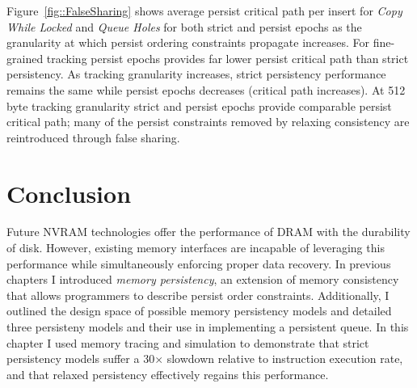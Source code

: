  

Figure~\ref{fig::FalseSharing} shows average persist critical path per insert for \emph{Copy While Locked} and \emph{Queue Holes} for both strict and persist epochs as the granularity at which persist ordering constraints propagate increases.
For fine-grained tracking persist epochs provides far lower persist critical path than strict persistency.
As tracking granularity increases, strict persistency performance remains the same while persist epochs decreases (critical path increases).
At 512 byte tracking granularity strict and persist epochs provide comparable persist critical path; many of the persist constraints removed by relaxing consistency are reintroduced through false sharing.

\section{Conclusion}
\label{sec:PersistencyEval:Conclusion}

Future NVRAM technologies offer the performance of DRAM with the durability of disk.
However, existing memory interfaces are incapable of leveraging this performance while simultaneously enforcing proper data recovery.
In previous chapters I introduced \emph{memory persistency}, an extension of memory consistency that allows programmers to describe persist order constraints.
Additionally, I outlined the design space of possible memory persistency models and detailed three persisteny models and their use in implementing a persistent queue.
In this chapter I used memory tracing and simulation to demonstrate that strict persistency models suffer a 30$\times$ slowdown relative to instruction execution rate, and that relaxed persistency effectively regains this performance.
